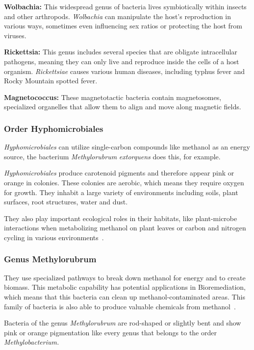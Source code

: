 \textbf{Wolbachia:} This widespread genus of bacteria lives symbiotically within insects and other arthropods.
\emph{Wolbachia} can manipulate the host's reproduction in various ways, sometimes even influencing sex ratios or protecting the host from viruses.

\textbf{Rickettsia:} This genus includes several species that are obligate intracellular pathogens, meaning they can only live and reproduce inside the cells of a host organism.
\emph{Rickettsiae} causes various human diseases, including typhus fever and Rocky Mountain spotted fever.

\textbf{Magnetococcus:} These magnetotactic bacteria contain magnetosomes, specialized
organelles that allow them to align and move along magnetic fields.

\subsubsection{Order Hyphomicrobiales}
\emph{Hyphomicrobiales} can utilize single-carbon compounds like methanol as an energy
source, the bacterium \emph{Methylorubrum} \emph{extorquens} does this, for example.

\emph{Hyphomicrobiales} produce carotenoid pigments and therefore appear pink or orange in colonies.
These colonies are aerobic, which means they require oxygen for growth.
They inhabit a large variety of environments including soils, plant surfaces, root structures, water and dust.

They also play important ecological roles in their habitats, like plant-microbe interactions when metabolizing methanol on plant leaves or carbon and nitrogen cycling in various environments~\cite{methylobacteria_groups}.

\subsubsection{Genus Methylorubrum}
They use specialized pathways to break down methanol for energy and to create biomass.
This metabolic capability has potential applications in Bioremediation, which
means that this bacteria can clean up methanol-contaminated areas.
This family of bacteria is also able to produce valuable chemicals from methanol~\cite{new_methylorubrum}.

Bacteria of the genus \emph{Methylorubrum} are rod-shaped or slightly bent and show pink or
orange pigmentation like every genus that belongs to the order \emph{Methylobacterium.}

